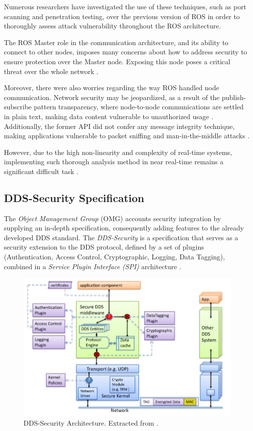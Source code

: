 Numerous researchers \cite{8794451, dieber2020penetration} have investigated the use of these techniques, such as port scanning and penetration testing, over the previous version of ROS in order to thoroughly assess attack vulnerability throughout the ROS architecture. 

The ROS Master role in the communication architecture, and its ability to connect to other nodes, imposes many concerns about how to address security to ensure protection over the Master node. Exposing this node poses a critical threat over the whole network \cite{8794451}. 

Moreover, there were also worries regarding the way ROS handled node communication. Network security may be jeopardized, as a result of the publish-subscribe pattern transparency, where node-to-node communications are settled in plain text, making data content vulnerable to unauthorized usage \cite{kim2018security, white2016sros}. Additionally, the former API did not confer any message integrity technique, making applications vulnerable to packet sniffing and man-in-the-middle attacks \cite{white2016sros}.
 
However, due to the high non-linearity and complexity of real-time systems, implementing such thorough analysis method in near real-time remains a significant difficult task \cite{diao2009design}.

\subsection{DDS-Security Specification}

The \textit{Object Management Group} (OMG) \cite{3} accounts security integration by supplying an in-depth specification, consequently adding features to the already developed DDS standard. The \textit{DDS-Security} is a specification that serves as a security extension to the DDS protocol, defined by a set of plugins (Authentication, Access Control, Cryptographic, Logging, Data Tagging), combined in a \textit{Service Plugin Interface (SPI)} architecture \cite{8442103, ros-dds-integration}.

\begin{figure}[H]
    \centering
    \includegraphics[width=0.7\linewidth]{images/dds-security-architecture.png}
    \caption{DDS-Security Architecture. Extracted from \cite{dds-s}.}
    \label{fig:dds-security-architecture}
\end{figure}

